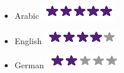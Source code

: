 \begin{itemize}
\item Arabic  \includegraphics[scale=0.3]{img/5stars.png}
\item English \includegraphics[scale=0.3]{img/4stars.png}
\item German  \includegraphics[scale=0.3]{img/2stars.png}
\end{itemize}